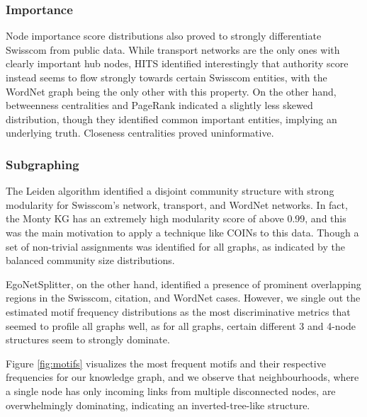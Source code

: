 \subsubsection{Importance} 
Node importance score distributions also proved to strongly differentiate Swisscom from public data. While transport networks are the only ones with clearly important hub nodes, HITS identified interestingly that authority score instead seems to flow strongly towards certain Swisscom entities, with the WordNet graph being the only other with this property. On the other hand, betweenness centralities and PageRank indicated a slightly less skewed distribution, though they identified common important entities, implying an underlying truth. Closeness centralities proved uninformative.

\subsubsection{Subgraphing} The Leiden algorithm identified a disjoint community structure with strong modularity for Swisscom's network, transport, and WordNet networks. In fact, the Monty KG has an extremely high modularity score of above 0.99, and this was the main motivation to apply a technique like COINs to this data. Though a set of non-trivial assignments was identified for all graphs, as indicated by the balanced community size distributions. 

EgoNetSplitter, on the other hand, identified a presence of prominent overlapping regions in the Swisscom, citation, and WordNet cases. However, we single out the estimated motif frequency distributions as the most discriminative metrics that seemed to profile all graphs well, as for all graphs, certain different 3 and 4-node structures seem to strongly dominate. 

Figure \ref{fig:motifs} visualizes the most frequent motifs and their respective frequencies for our knowledge graph, and we observe that neighbourhoods, where a single node has only incoming links from multiple disconnected nodes, are overwhelmingly dominating, indicating an inverted-tree-like structure.

